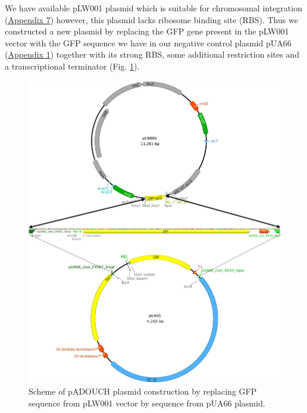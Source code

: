 We have available pLW001 plasmid which is suitable for chromosomal integration (\hyperlink{pLW001}{Appendix 7}) however, this plasmid lacks ribosome binding site (RBS).
Thus we constructed a new plasmid by replacing the GFP gene present in the pLW001 vector with the GFP sequence we have in our negative control plasmid pUA66 (\hyperlink{pUA66seq}{Appendix 1}) together with its strong RBS, some additional restriction sites and a transcriptional terminator (Fig. \ref{cloning}).
\begin{figure}[ht!]
  \centering
  \includegraphics[scale=0.41]{text/Pictures/Cloning.png}
    \caption{Scheme of pADOUCH plasmid construction by replacing GFP sequence from pLW001 vector by sequence from pUA66 plasmid.}
    \label{cloning}
\end{figure}

